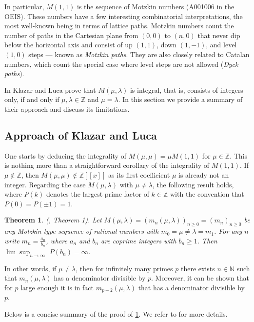 \documentclass[11pt]{article}
\theoremstyle{definition}
\theoremstyle{plain}
\newtheorem{thm}[defi]{Theorem}
\theoremstyle{remark}
\begin{document}
In particular, $M(1,1)$ is the sequence of Motzkin numbers (\href{https://oeis.org/A001006}{A001006} in the OEIS). These numbers have a few interesting combinatorial interpretations, the most well-known being in terms of lattice paths. Motzkin numbers count the number of paths in the Cartesian plane from $(0,0)$ to $(n,0)$ that never dip below the horizontal axis and consist of up $(1,1)$, down $(1,-1)$, and level $(1,0)$ steps — known as \emph{Motzkin paths}. They are also closely related to Catalan numbers, which count the special case where level steps are not allowed (\emph{Dyck paths}).

In \cite{KL05} Klazar and Luca prove that $M(\mu, \lambda)$ is integral, that is, consists of integers only, if and only if $\mu, \lambda \in \mathbb{Z}$ and $\mu = \lambda$. In this section we provide a summary of their approach and discuss its limitations.

\subsection{Approach of Klazar and Luca} 
One starts by deducing the integrality of $M(\mu,\mu)=\mu M(1,1)$ for $\mu \in \mathbb{Z}$. This is nothing more than a straightforward corollary of the integrality of $M(1,1)$. If $\mu \notin\mathbb{Z}$, then $M(\mu,\mu)\notin\mathbb{Z}[[x]]$ as its first coefficient $\mu$ is already not an integer.
Regarding the case $M(\mu, \lambda)$ with $\mu \neq \lambda$, the following result holds, where $P(k)$ denotes the largest prime factor of $k \in \mathbb{Z}$ with the convention that $P(0) = P(\pm 1) = 1$.

\begin{thm}\label{thm:1.1} 
(\cite{KL05}, Theorem 1).
Let $M(\mu, \lambda) = (m_n(\mu, \lambda))_{n \geq 0} = (m_n)_{n \geq 0}$ be any Motzkin-type sequence of rational numbers with $m_0 = \mu \neq \lambda = m_1$. For any $n$ write $m_n = \frac{a_n}{b_n}$, where $a_n$ and $b_n$ are coprime integers with $b_n \geq 1$. Then $\lim \sup_{n \rightarrow \infty}$ $P(b_n) = \infty$.
\end{thm}
In other words, if $\mu \neq \lambda$, then for infinitely many primes $p$ there exists $n \in \mathbb{N}$ such that $m_n(\mu, \lambda)$ has a denominator divisible by $p$. Moreover, it can be shown that for $p$ large enough it is in fact $m_{p-2}(\mu, \lambda)$ that has a denominator divisible by $p$.

Below is a concise summary of the proof of \cref{thm:1.1}. We refer to \cite{KL05} for more details.
\end{document}
